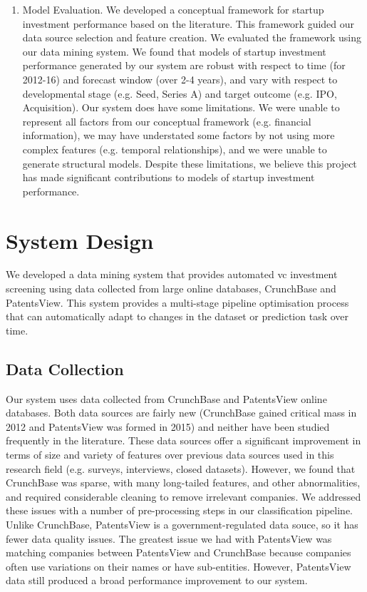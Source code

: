 \documentclass[../thesis/thesis.tex]{subfiles}
\begin{document}
\begin{enumerate}
\item Model Evaluation. We developed a conceptual framework for startup investment performance based on the literature. This framework guided our data source selection and feature creation. We evaluated the framework using our data mining system. We found that models of startup investment performance generated by our system are robust with respect to time (for 2012-16) and forecast window (over 2-4 years), and vary with respect to developmental stage (e.g. Seed, Series A) and target outcome (e.g. IPO, Acquisition). Our system does have some limitations. We were unable to represent all factors from our conceptual framework (e.g. financial information), we may have understated some factors by not using more complex features (e.g. temporal relationships), and we were unable to generate structural models. Despite these limitations, we believe this project has made significant contributions to models of startup investment performance.

\end{enumerate}

\section{System Design}

We developed a data mining system that provides automated \gls{vc} investment screening using data collected from large online databases, CrunchBase and PatentsView. This system provides a multi-stage pipeline optimisation process that can automatically adapt to changes in the dataset or prediction task over time.

\subsection{Data Collection}

Our system uses data collected from CrunchBase and PatentsView online databases. Both data sources are fairly new (CrunchBase gained critical mass in 2012 and PatentsView was formed in 2015) and neither have been studied frequently in the literature. These data sources offer a significant improvement in terms of size and variety of features over previous data sources used in this research field (e.g. surveys, interviews, closed datasets). However, we found that CrunchBase was sparse, with many long-tailed features, and other abnormalities, and required considerable cleaning to remove irrelevant companies. We addressed these issues with a number of pre-processing steps in our classification pipeline. Unlike CrunchBase, PatentsView is a government-regulated data souce, so it has fewer data quality issues. The greatest issue we had with PatentsView was matching companies between PatentsView and CrunchBase because companies often use variations on their names or have sub-entities. However, PatentsView data still produced a broad performance improvement to our system.
\end{document}
